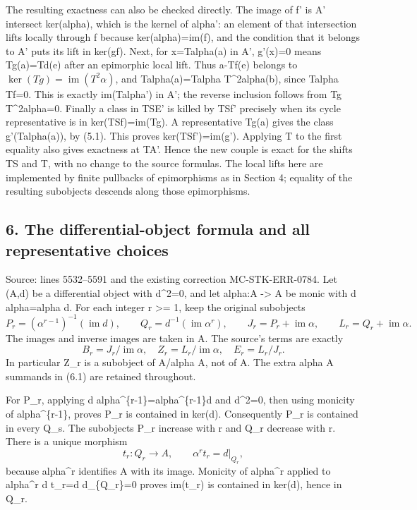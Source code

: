 The resulting exactness can also be checked directly. The image of f' is A' intersect ker(alpha), which is the kernel of alpha': an element of that intersection lifts locally through f because ker(alpha)=im(f), and the condition that it belongs to A' puts its lift in ker(gf). Next, for x=Talpha(a) in A', g'(x)=0 means Tg(a)=Td(e) after an epimorphic local lift. Thus a-Tf(e) belongs to \(\ker(Tg)=\operatorname{im}(T^2\alpha)\), and Talpha(a)=Talpha T\^{}2alpha(b), since Talpha Tf=0. This is exactly im(Talpha') in A'; the reverse inclusion follows from Tg T\^{}2alpha=0. Finally a class in TSE' is killed by TSf' precisely when its cycle representative is in ker(TSf)=im(Tg). A representative Tg(a) gives the class g'(Talpha(a)), by (5.1). This proves ker(TSf')=im(g'). Applying T to the first equality also gives exactness at TA'. Hence the new couple is exact for the shifts TS and T, with no change to the source formulas. The local lifts here are implemented by finite pullbacks of epimorphisms as in Section 4; equality of the resulting subobjects descends along those epimorphisms.

\subsection{6. The differential-object formula and all representative choices}\label{note-05-the-differential-object-formula-and-all-representative-choices}

Source: lines 5532--5591 and the existing correction MC-STK-ERR-0784. Let (A,d) be a differential object with d\^{}2=0, and let alpha:A -\textgreater{} A be monic with d alpha=alpha d. For each integer r \textgreater= 1, keep the original subobjects \[
P_r=(\alpha^{r-1})^{-1}(\operatorname{im}d),\qquad
Q_r=d^{-1}(\operatorname{im}\alpha^r),\qquad
J_r=P_r+\operatorname{im}\alpha,\qquad
L_r=Q_r+\operatorname{im}\alpha.                           \tag{6.1}
\] The images and inverse images are taken in A. The source's terms are exactly \[
B_r=J_r/\operatorname{im}\alpha,\quad
Z_r=L_r/\operatorname{im}\alpha,\quad
E_r=L_r/J_r.                                             \tag{6.2}
\] In particular Z\_r is a subobject of A/alpha A, not of A. The extra alpha A summands in (6.1) are retained throughout.

For P\_r, applying d alpha\^{}\{r-1\}=alpha\^{}\{r-1\}d and d\^{}2=0, then using monicity of alpha\^{}\{r-1\}, proves P\_r is contained in ker(d). Consequently P\_r is contained in every Q\_s. The subobjects P\_r increase with r and Q\_r decrease with r. There is a unique morphism \[
t_r:Q_r\longrightarrow A,\qquad
\alpha^r t_r=d|_{Q_r},                                   \tag{6.3}
\] because alpha\^{}r identifies A with its image. Monicity of alpha\^{}r applied to alpha\^{}r d t\_r=d d\textbar\_\{Q\_r\}=0 proves im(t\_r) is contained in ker(d), hence in Q\_r.


